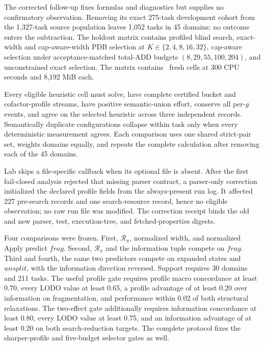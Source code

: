 \documentclass[letterpaper]{article}
\newcommand{\unioneffort}{\ensuremath{\mathit{unsplit}}}
\newcommand{\fragfactor}{\ensuremath{\mathit{frag}}}
\newcommand{\profilescore}{\ensuremath{\mathcal{R}_{\pi}}}
\theoremstyle{plain}
\theoremstyle{definition}
\theoremstyle{remark}
\begin{document}
The corrected follow-up fixes formulas and diagnostics but supplies no
confirmatory observation.  Removing its exact 275-task development cohort
from the 1,327-task source population leaves 1,052 tasks in 45 domains; no
outcome enters the subtraction.  The holdout matrix contains profiled blind
search, exact-width and cap-aware-width PDB selection at
$K\in\{2,4,8,16,32\}$, cap-aware selection under acceptance-matched total-ADD
budgets $(8,29,55,100,204)$, and unconstrained exact selection.  The matrix
contains \HoldoutCells\ fresh cells at 300 CPU seconds and 8,192 MiB each.

Every eligible heuristic cell must solve, have complete certified bucket and
cofactor-profile streams, have positive semantic-union effort, conserve all
per-$g$ events, and agree on the selected heuristic across three independent
records.  Semantically duplicate configurations collapse within task only
when every deterministic measurement agrees.  Each comparison uses one
shared strict-pair set, weights domains equally, and repeats the complete
calculation after removing each of the 45 domains.

Lab skips a file-specific callback when its optional file is absent.  After
the first fail-closed analysis rejected that missing parser contract, a
parser-only correction initialized the declared profile fields from the
always-present run log.  It affected 227 pre-search records and one
search-resource record, hence no eligible observation; no raw run file was
modified.  The correction receipt binds the old and new parser, test,
execution-tree, and fetched-properties digests.

Four comparisons were frozen.  First, $\profilescore$, normalized width, and
normalized Apply predict $\fragfactor$.  Second, $\profilescore$ and the
information tuple compete on $\fragfactor$.  Third and fourth, the same two
predictors compete on expanded states and $\unioneffort$, with the information
direction reversed.  Support requires 30 domains and 211 tasks.  The useful
profile gate requires profile macro concordance at least 0.70, every LODO
value at least 0.65, a profile advantage of at least 0.20 over information on
fragmentation, and performance within 0.02 of both structural relaxations.
The two-effect gate additionally requires information concordance at least
0.80, every LODO value at least 0.75, and an information advantage of at least
0.20 on both search-reduction targets.  The complete protocol fixes the
sharper-profile and five-budget selector gates as well.
\end{document}
